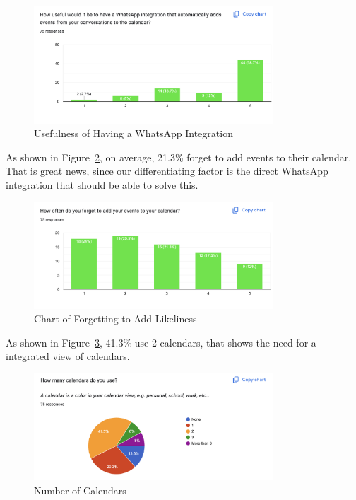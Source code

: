 \documentclass[12pt,a4paper,twoside]{report}
\begin{document}
\begin{figure}[!h]
    \centering
    \includegraphics[width=0.8\textwidth]{images/survey/usefullness.png}
    \caption{Usefulness of Having a WhatsApp Integration}
    \label{fig:usefullness}
\end{figure}

As shown in Figure~\ref{fig:forget-to-add}, on average, 21.3\% forget to add events to their calendar. That is great news, since our differentiating factor is the direct WhatsApp integration that should be able to solve this.

\begin{figure}[!h]
    \centering
    \includegraphics[width=0.8\textwidth]{images/survey/forget-to-add.png}
    \caption{Chart of Forgetting to Add Likeliness}
    \label{fig:forget-to-add}
\end{figure}

As shown in Figure~\ref{fig:number-of-calendars}, 41.3\% use 2 calendars, that shows the need for a integrated view of calendars.

\begin{figure}[!h]
    \centering
    \includegraphics[width=0.8\textwidth]{images/survey/number-of-calendars.png}
    \caption{Number of Calendars}
    \label{fig:number-of-calendars}
\end{figure}
\end{document}
